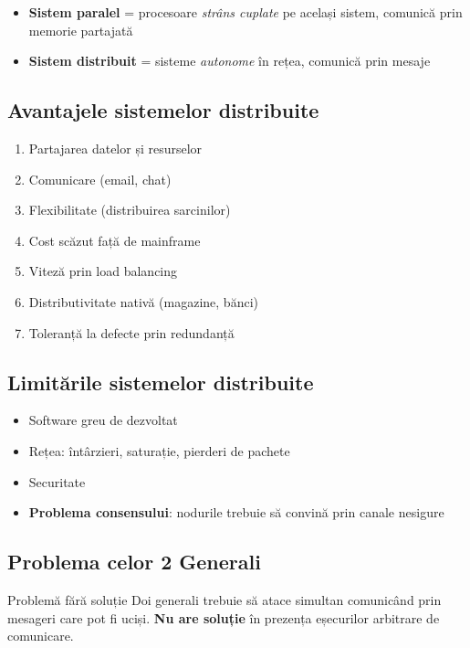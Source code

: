 \documentclass[a4paper,11pt]{article}
\begin{document}
\begin{itemize}[noitemsep]
  \item \textbf{Sistem paralel} = procesoare \emph{strâns cuplate} pe același sistem, comunică prin memorie partajată
  \item \textbf{Sistem distribuit} = sisteme \emph{autonome} în rețea, comunică prin mesaje
\end{itemize}

\subsection{Avantajele sistemelor distribuite}
\begin{enumerate}[noitemsep]
  \item Partajarea datelor și resurselor
  \item Comunicare (email, chat)
  \item Flexibilitate (distribuirea sarcinilor)
  \item Cost scăzut față de mainframe
  \item Viteză prin load balancing
  \item Distributivitate nativă (magazine, bănci)
  \item Toleranță la defecte prin redundanță
\end{enumerate}

\subsection{Limitările sistemelor distribuite}
\begin{itemize}[noitemsep]
  \item Software greu de dezvoltat
  \item Rețea: întârzieri, saturație, pierderi de pachete
  \item Securitate
  \item \textbf{Problema consensului}: nodurile trebuie să convină prin canale nesigure
\end{itemize}

\subsection{Problema celor 2 Generali}

\begin{defbox}{Problemă fără soluție}
Doi generali trebuie să atace simultan comunicând prin mesageri care pot fi uciși.
\textbf{Nu are soluție} în prezența eșecurilor arbitrare de comunicare.
\end{defbox}
\end{document}
